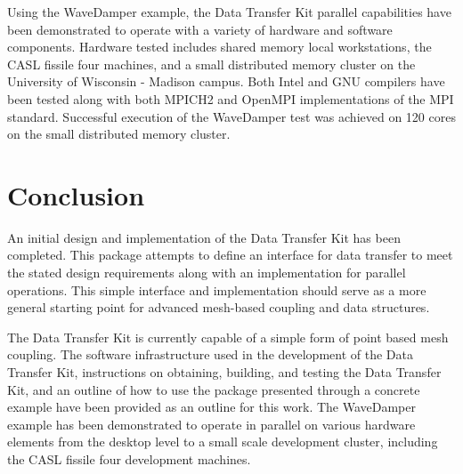 \documentclass[letterpaper]{article}
\begin{document}
Using the WaveDamper example, the Data Transfer Kit parallel
capabilities have been demonstrated to operate with a variety of
hardware and software components. Hardware tested includes shared
memory local workstations, the CASL fissile four machines, and a small
distributed memory cluster on the University of Wisconsin - Madison
campus. Both Intel and GNU compilers have been tested along with both
MPICH2 and OpenMPI implementations of the MPI standard. Successful
execution of the WaveDamper test was achieved on 120 cores on the
small distributed memory cluster.

\section{Conclusion}
An initial design and implementation of the Data Transfer Kit has been
completed. This package attempts to define an interface for data
transfer to meet the stated design requirements along with an
implementation for parallel operations. This simple interface and
implementation should serve as a more general starting point for
advanced mesh-based coupling and data structures.

The Data Transfer Kit is currently capable of a simple form of point
based mesh coupling. The software infrastructure used in the
development of the Data Transfer Kit, instructions on obtaining,
building, and testing the Data Transfer Kit, and an outline of how to
use the package presented through a concrete example have been
provided as an outline for this work. The WaveDamper example has been
demonstrated to operate in parallel on various hardware elements from
the desktop level to a small scale development cluster, including the
CASL fissile four development machines. 

\pagebreak


\end{document}
